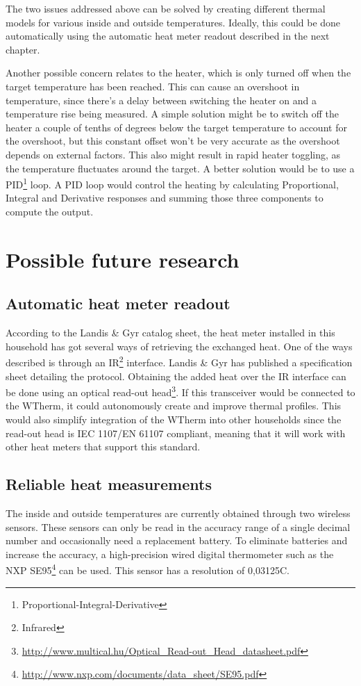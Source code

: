 \documentclass[12pt,a4paper,final]{report}
\begin{document}
The two issues addressed above can be solved by creating different thermal models for various inside and outside temperatures. Ideally, this could be done automatically using the automatic heat meter readout described in the next chapter.

Another possible concern relates to the heater, which is only turned off when the target temperature has been reached. This can cause an overshoot in temperature, since there's a delay between switching the heater on and a temperature rise being measured. A simple solution might be to switch off the heater a couple of tenths of degrees below the target temperature to account for the overshoot, but this constant offset won't be very accurate as the overshoot depends on external factors. This also might result in rapid heater toggling, as the temperature fluctuates around the target. A better solution would be to use a PID\footnote{Proportional-Integral-Derivative} loop. A PID loop would control the heating by calculating Proportional, Integral and Derivative responses and summing those three components to compute the output\cite{PIDexplained}.


\chapter{Possible future research}
\section{Automatic heat meter readout}
According to the Landis \& Gyr catalog sheet, the heat meter installed in this household has got several ways of retrieving the exchanged heat\cite{landisgyrcat14}. One of the ways described is through an IR\footnote{Infrared} interface. Landis \& Gyr has published a specification sheet\cite{landisgyrser14} detailing the protocol. Obtaining the added heat over the IR interface can be done using an optical read-out head\footnote{\url{http://www.multical.hu/Optical_Read-out_Head_datasheet.pdf}}. If this transceiver would be connected to the WTherm, it could autonomously create and improve thermal profiles. This would also simplify integration of the WTherm into other households since the read-out head is IEC 1107/EN 61107 compliant, meaning that it will work with other heat meters that support this standard.

\section{Reliable heat measurements}
The inside and outside temperatures are currently obtained through two wireless sensors. These sensors can only be read in the accuracy range of a single decimal number and occasionally need a replacement battery. To eliminate batteries and increase the accuracy, a high-precision wired digital thermometer such as the NXP SE95\footnote{\url{http://www.nxp.com/documents/data_sheet/SE95.pdf}} can be used. This sensor has a resolution of 0,03125\degree{}C.
\end{document}
